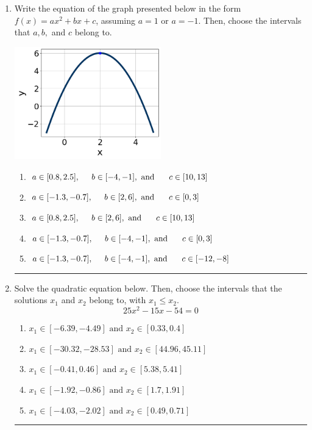 \documentclass[14pt]{extbook}
\newcommand{\litem}[1]{\item#1\hspace*{-1cm}\rule{\textwidth}{0.4pt}}
\begin{document}
\begin{enumerate}
{\begin{enumerate}[label=\Alph*.]
\end{enumerate} }
\litem{
Write the equation of the graph presented below in the form $f(x)=ax^2+bx+c$, assuming  $a=1$ or $a=-1$. Then, choose the intervals that $a, b,$ and $c$ belong to.
\begin{center}
    \includegraphics[width=0.5\textwidth]{../Figures/quadraticGraphToEquationCopyC.png}
\end{center}
\begin{enumerate}[label=\Alph*.]
\item \( a \in [0.8, 2.5], \hspace*{5mm} b \in [-4, -1], \text{ and } \hspace*{5mm} c \in [10, 13] \)
\item \( a \in [-1.3, -0.7], \hspace*{5mm} b \in [2, 6], \text{ and } \hspace*{5mm} c \in [0, 3] \)
\item \( a \in [0.8, 2.5], \hspace*{5mm} b \in [2, 6], \text{ and } \hspace*{5mm} c \in [10, 13] \)
\item \( a \in [-1.3, -0.7], \hspace*{5mm} b \in [-4, -1], \text{ and } \hspace*{5mm} c \in [0, 3] \)
\item \( a \in [-1.3, -0.7], \hspace*{5mm} b \in [-4, -1], \text{ and } \hspace*{5mm} c \in [-12, -8] \)

\end{enumerate} }
\litem{
Solve the quadratic equation below. Then, choose the intervals that the solutions $x_1$ and $x_2$ belong to, with $x_1 \leq x_2$.\[ 25x^{2} -15 x -54 = 0 \]\begin{enumerate}[label=\Alph*.]
\item \( x_1 \in [-6.39, -4.49] \text{ and } x_2 \in [0.33, 0.4] \)
\item \( x_1 \in [-30.32, -28.53] \text{ and } x_2 \in [44.96, 45.11] \)
\item \( x_1 \in [-0.41, 0.46] \text{ and } x_2 \in [5.38, 5.41] \)
\item \( x_1 \in [-1.92, -0.86] \text{ and } x_2 \in [1.7, 1.91] \)
\item \( x_1 \in [-4.03, -2.02] \text{ and } x_2 \in [0.49, 0.71] \)

\end{enumerate} }
\end{enumerate}
\end{document}
